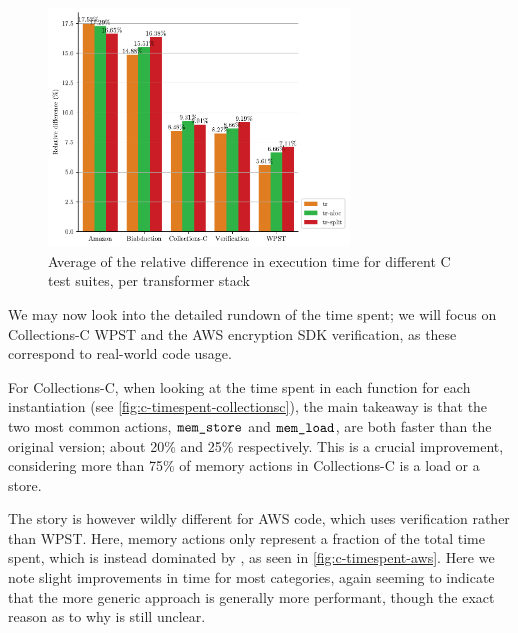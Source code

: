 \begin{figure}
	\centering
	\includegraphics[width=8cm]{figures/c/avg_mode_relative_diff.pdf}
	\caption{Average of the relative difference in execution time for different C test suites, per transformer stack}
	\label{fig:c-perf-bars}
\end{figure}

We may now look into the detailed rundown of the time spent; we will focus on Collections-C WPST and the AWS encryption SDK verification, as these correspond to real-world code usage.

For Collections-C, when looking at the time spent in each function for each instantiation (see \autoref{fig:c-timespent-collectionsc}), the main takeaway is that the two most common actions, $\texttt{mem\_store}$ and $\texttt{mem\_load}$, are both faster than the original version; about 20\% and 25\% respectively. This is a crucial improvement, considering more than 75\% of memory actions in Collections-C is a load or a store.

The story is however wildly different for AWS code, which uses verification rather than WPST. Here, memory actions only represent a fraction of the total time spent, which is instead dominated by \consume, as seen in \autoref{fig:c-timespent-aws}. Here we note slight improvements in time for most categories, again seeming to indicate that the more generic approach is generally more performant, though the exact reason as to why is still unclear.

